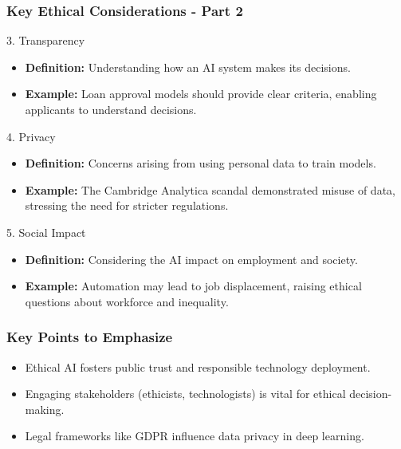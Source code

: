 \documentclass[aspectratio=169]{beamer}
\begin{document}
\begin{frame}[fragile]
    \frametitle{Key Ethical Considerations - Part 2}
    \begin{block}{3. Transparency}
        \begin{itemize}
            \item \textbf{Definition:} Understanding how an AI system makes its decisions.
            \item \textbf{Example:} Loan approval models should provide clear criteria, enabling applicants to understand decisions.
        \end{itemize}
    \end{block}
    
    \begin{block}{4. Privacy}
        \begin{itemize}
            \item \textbf{Definition:} Concerns arising from using personal data to train models.
            \item \textbf{Example:} The Cambridge Analytica scandal demonstrated misuse of data, stressing the need for stricter regulations.
        \end{itemize}
    \end{block}

    \begin{block}{5. Social Impact}
        \begin{itemize}
            \item \textbf{Definition:} Considering the AI impact on employment and society.
            \item \textbf{Example:} Automation may lead to job displacement, raising ethical questions about workforce and inequality.
        \end{itemize}
    \end{block}
\end{frame}

\begin{frame}[fragile]
    \frametitle{Key Points to Emphasize}
    \begin{itemize}
        \item Ethical AI fosters public trust and responsible technology deployment.
        \item Engaging stakeholders (ethicists, technologists) is vital for ethical decision-making.
        \item Legal frameworks like GDPR influence data privacy in deep learning.
    \end{itemize}
\end{frame}
\end{document}
